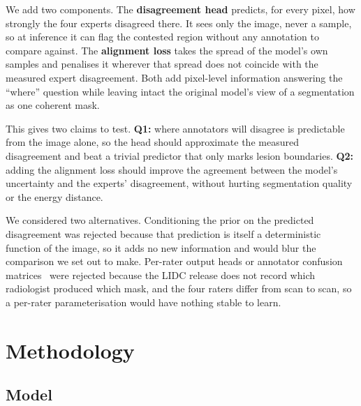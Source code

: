 \documentclass[10pt]{article}
\begin{document}
We add two components. The \textbf{disagreement head} predicts, for every pixel,
how strongly the four experts disagreed there. It sees only the image, never a
sample, so at inference it can flag the contested region without any annotation
to compare against. The \textbf{alignment loss} takes the spread of the model's
own samples and penalises it wherever that spread does not coincide with the
measured expert disagreement. Both add pixel-level information answering the
``where'' question while leaving intact the original model's view of a
segmentation as one coherent mask.

This gives two claims to test. \textbf{Q1:} where annotators will disagree is
predictable from the image alone, so the head should approximate the measured
disagreement and beat a trivial predictor that only marks lesion boundaries.
\textbf{Q2:} adding the alignment loss should improve the agreement between the
model's uncertainty and the experts' disagreement, without hurting segmentation
quality or the energy distance.

We considered two alternatives. Conditioning the prior on the predicted
disagreement was rejected because that prediction is itself a deterministic
function of the image, so it adds no new information and would blur the
comparison we set out to make. Per-rater output heads or annotator confusion
matrices~\cite{zhang2020} were rejected because the LIDC release does not record
which radiologist produced which mask, and the four raters differ from scan to
scan, so a per-rater parameterisation would have nothing stable to learn.

\section{Methodology}\label{sec:method}

\subsection{Model}
\end{document}
